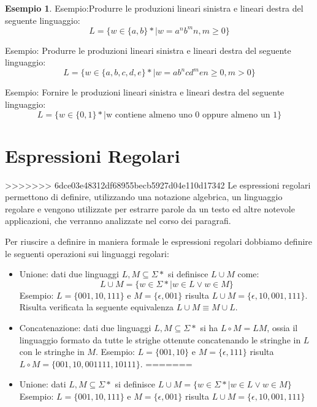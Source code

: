 \documentclass[a4paper]{book}
\theoremstyle{definition}%
\newtheorem*{esempio}{Esempio}
\begin{document}
\begin{esempio}
  Esempio:Produrre le produzioni lineari sinistra e lineari destra del seguente linguaggio:
  \begin{equation*}
    L = \{w \in \{a, b\}* | w = a^nb^m n,m \geq 0\}
  \end{equation*}

  Esempio: Produrre le produzioni lineari sinistra e lineari destra del seguente linguaggio:
  \begin{equation*}
    L = \{w \in \{a,b,c,d,e\}* | w = ab^ncd^me n \geq 0, m > 0\}
  \end{equation*}

  Esempio: Fornire le produzioni lineari sinistra e lineari destra del seguente linguaggio:
  \begin{equation*}
    L = \{w \in \{0,1\}* | \text{w contiene almeno uno 0 oppure almeno un 1}\}
  \end{equation*}

  \section{Espressioni Regolari}
>>>>>>> 6dce03e48312df68955becb5927d04e110d17342
  Le espressioni regolari permettono di definire, utilizzando una notazione algebrica, un linguaggio regolare e vengono utilizzate
  per estrarre parole da un testo ed altre notevole applicazioni, che verranno analizzate nel corso dei paragrafi.

  Per riuscire a definire in maniera formale le espressioni regolari dobbiamo definire le seguenti operazioni sui linguaggi regolari:
  \begin{itemize}
<<<<<<< HEAD
  \item Unione: dati due linguaggi $L,M \subseteq \Sigma*$ si definisce $L \cup M$ come:
    \[ L \cup M = \{w \in \Sigma* | w \in L \lor w \in M\} \] 
    Esempio: $L = \{001, 10, 111\}$ e $M = \{\epsilon, 001\}$ risulta $L \cup M = \{\epsilon, 10, 001, 111\}$.\newline
    Risulta verificata la seguente equivalenza $L\cup M \equiv M\cup L$.

  \item Concatenazione: dati due linguaggi $L, M \subseteq \Sigma*$ si ha $L \circ M = LM$, ossia il linguaggio formato da tutte le strighe
    ottenute concatenando le stringhe in $L$ con le stringhe in $M$.
    Esempio: $L = \{001,10\}$ e $M = \{\epsilon, 111\}$ risulta $L \circ M = \{001, 10, 001111, 10111\}$.
=======
  \item Unione: dati $L,M \subseteq \Sigma*$ si definisce $L \cup M = \{w \in \Sigma* | w \in L \vee w \in M\}$
    Esempio: $L = \{001, 10, 111\}$ e $M = \{\epsilon, 001\}$ risulta $L \cup M = \{\epsilon, 10, 001, 111\}$


\end{itemize}
\end{esempio}
\end{document}
